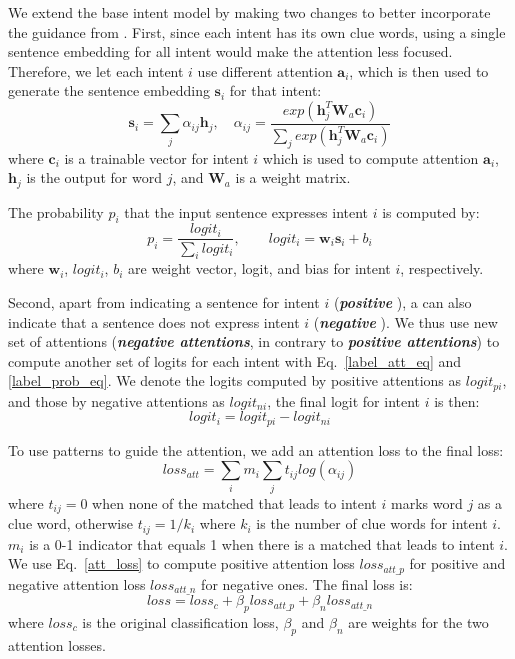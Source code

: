 We extend the base intent model by making two changes to better incorporate the guidance from \RE.
First, since each intent has its own clue words, using a single sentence embedding for all intent %
would make the attention less focused.
Therefore, we let each intent $i$ use different attention $\textbf{a}_i$, which is then used to generate the sentence embedding $\textbf{s}_i$ for that intent:
\begin{equation}
\textbf{s}_i = \sum_{j}{\alpha_{ij}\textbf{h}_j}, \quad
\alpha_{ij}=\frac{exp(\textbf{h}_j^T\textbf{W}_a\textbf{c}_i)}{\sum_{j}{exp(\textbf{h}_j^T\textbf{W}_a\textbf{c}_i)}}
\label{label_att_eq}
\end{equation}
where $\textbf{c}_i$ is a trainable vector for intent $i$ which is used to compute attention $\textbf{a}_i$, $\textbf{h}_j$ is the \BLSTM output for word $j$, and $\textbf{W}_a$ is a weight matrix.

The probability $p_i$ that the input sentence expresses intent $i$ is computed by:
\begin{equation}
p_i = \frac{logit_i}{\sum_{i}{logit_i}}, \quad\quad logit_i=\textbf{w}_i\textbf{s}_i + b_i
\label{label_prob_eq}
\end{equation}
where $\textbf{w}_i$, $logit_i$, $b_i$ are weight vector, logit, and bias for intent $i$, respectively.

Second, apart from indicating a sentence for intent $i$ (\textbf{\emph{positive \REs}}),
a \RE can also indicate that a sentence does not express intent $i$ (\textbf{\emph{negative \REs}}).
We thus use new set of attentions (\textbf{\emph{negative attentions}}, in contrary to \textbf{\emph{positive attentions}})
to compute another set of logits for each intent with Eq.~\ref{label_att_eq} and \ref{label_prob_eq}.
We denote the logits computed by positive attentions as $logit_{pi}$, and those by negative attentions as $logit_{ni}$, the final logit for intent $i$ is then:
\begin{equation}
logit_i = logit_{pi} - logit_{ni}
\end{equation}

To use \RE patterns to guide the attention, we add an attention loss to the final loss:
\begin{equation}
loss_{att} = \sum_{i}{m_i\sum_{j}{t_{ij}log(\alpha_{ij})}}
\label{att_loss}
\end{equation}
where $t_{ij} = 0$ when none of the matched \REs that leads to intent $i$ marks word $j$ as a clue word, otherwise $t_{ij} = 1/k_{i}$ where $k_i$ is the number of clue words
for intent $i$. $m_i$ is a 0-1 indicator that equals 1 when there is a matched \RE that leads to intent $i$. We use Eq.~\ref{att_loss} to compute positive attention loss $loss_{att\_p}$ for positive \REs and negative attention loss $loss_{att\_n}$ for negative ones. The final loss is:
\begin{equation}
loss = loss_{c} + \beta_p loss_{att\_p} + \beta_n loss_{att\_n}
\end{equation}
where $loss_{c}$ is the original classification loss, $\beta_p$ and $\beta_n$ are weights for the two attention losses.

